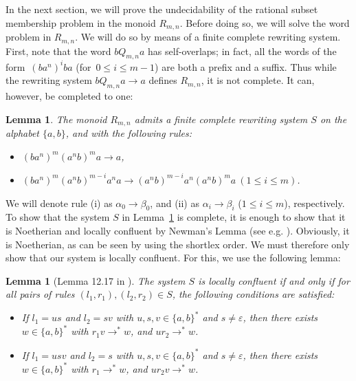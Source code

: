 \documentclass{amsart}
\theoremstyle{plain}
\newtheorem{lemma}[theorem]{Lemma}
\theoremstyle{definition}
\newtheorem{remark}[theorem]{Remark}
\begin{document}

In the next section, we will prove the undecidability of the rational subset membership problem in the monoid $R_{m,n}$. Before doing so, we will solve the word problem in $R_{m,n}$. We will do so by means of a finite complete rewriting system. First, note that the word $bQ_{m,n}a$ has self-overlaps; in fact, all the words of the form~$(ba^n)^i ba$ (for~$0 \leq i \leq m-1$) are both a prefix and a suffix. Thus while the rewriting system $bQ_{m,n}a \rightarrow a$ defines $R_{m,n}$, it is not complete. It can, however, be completed to one:

\begin{lemma}\label{lem: FCRS}
The monoid $R_{m,n}$ admits a finite complete rewriting system $S$ on the alphabet $\{a, b\}$, and with the following rules:
\begin{itemize}[topsep=0pt]
\item[(i)] $(ba^n)^m (a^nb)^{m} a \longrightarrow a$,
\item[(ii)] $(ba^n)^m (a^nb)^{m-i} a^n a \longrightarrow (a^nb)^{m-i} a^n (a^n b)^{m} a \: (1 \leq i \leq m)$.
\end{itemize}
\end{lemma}

We will denote rule (i) as $\alpha_0 \to \beta_0$, and (ii) as $\alpha_i \to \beta_i$ ($1 \leq i \leq m$), respectively. To show that the system $S$ in Lemma~\ref{lem: FCRS} is complete, it is enough to show that it is Noetherian and locally confluent by Newman's Lemma (see e.g. \cite[Lemma 12.15]{holt2005handbook}). Obviously, it is Noetherian, as can be seen by using the shortlex order. We must therefore only show that our system is locally confluent. For this, we use the following lemma:

\begin{lemma}[Lemma 12.17 in \cite{holt2005handbook}]\label{lem: locally confluent}
The system $S$ is locally confluent if and only if for all pairs of rules $(l_1, r_1), (l_2, r_2) \in S$, the following
conditions are satisfied:
\begin{itemize}[topsep=0pt, partopsep=0pt]
\item[(i)] If $l_1 = us$ and $l_2 = sv$ with $u, s, v \in \{a,b\}^*$ and $s \neq \varepsilon$, then there exists $w \in \{a,b\}^*$ with $r_1 v \rightarrow ^* w$, and $u r_2 \rightarrow ^* w$.
\item[(ii)] If $l_1 = usv$ and $l_2 = s$ with $u, s, v \in \{a,b\}^*$ and $s \neq \varepsilon$, then there exists $w \in \{a,b\}^*$ with $r_1 \rightarrow^* w$, and $ur_2v \rightarrow^* w$.
\end{itemize}
\end{lemma}
\end{document}
